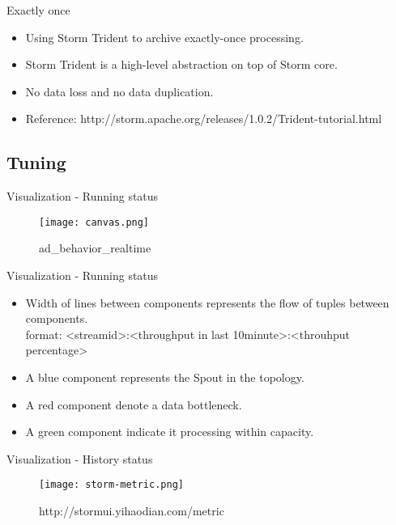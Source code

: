 \documentclass{beamer}
\begin{document}
\begin{frame}{Exactly once}
  
  \begin{itemize}
    \item Using Storm Trident to archive exactly-once processing.
    \item Storm Trident is a high-level abstraction on top of Storm core.
    \item No data loss and no data duplication.
    \item Reference: http://storm.apache.org/releases/1.0.2/Trident-tutorial.html
  \end{itemize}
\end{frame}

\subsection{Tuning}
\begin{frame}{Visualization - Running status}
  \begin{figure}
    \centering
    \texttt{[image: canvas.png]}
    \caption{ad\_behavior\_realtime}
  \end{figure}
\end{frame}
\begin{frame}{Visualization - Running status}
  \begin{itemize}
    \item Width of lines between components represents the flow of tuples between components.\\
      format: <streamid>:<throughput in last 10minute>:<throuhput percentage>
    \item A blue component represents the Spout in the topology.
    \item A red component denote a data bottleneck.
    \item A green component indicate it processing within capacity.
  \end{itemize}
\end{frame}
\begin{frame}{Visualization - History status}
  \begin{figure}
    \centering
    \texttt{[image: storm-metric.png]}
    \caption{http://stormui.yihaodian.com/metric}
  \end{figure}
\end{frame}
\end{document}
